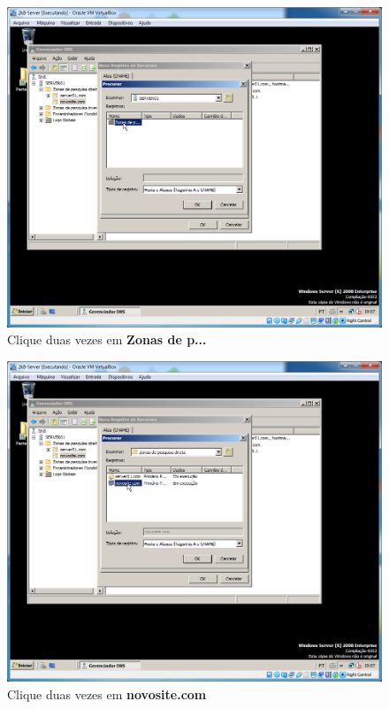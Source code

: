 \documentclass[10pt]{article}
\begin{document}
\begin{figure}[H]
    \centering
    \caption{Clique duas vezes em \textbf{Zonas de p...}}
    \label{fig:5532017}
    \includegraphics[width=\linewidth]{images/IIS/criando_um_novo_site/017.png}
\end{figure}
\begin{figure}[H]
    \centering
    \caption{Clique duas vezes em \textbf{novosite.com}}
    \label{fig:5532018}
    \includegraphics[width=\linewidth]{images/IIS/criando_um_novo_site/018.png}
\end{figure}
\end{document}
